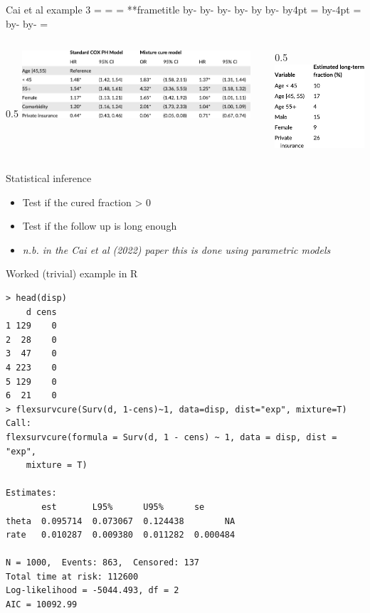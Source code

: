 \documentclass[aspectratio=169,12pt]{beamer} %
\makeatletter
\newif\ifsidebartheme
\newcommand*{\calculatespace}{%
    \contentheight=\paperheight%
    \ifx\beamer@frametitle\@empty%
        \setbox\@tempboxa=\box\voidb@x%
      \else%
        \setbox\@tempboxa=\vbox{%
          \vbox{}%
          {\parskip0pt\usebeamertemplate***{frametitle}}%
        }%
        \ifsidebartheme%
          \advance\contentheight by-1em%
        \fi%
      \fi%
    \advance\contentheight by-\ht\@tempboxa%
    \advance\contentheight by-\dp\@tempboxa%
    \advance\contentheight by-\beamer@frametopskip%
    \ifbeamer@plainframe%
    \contentbottom=0pt%
    \else%
    \advance\contentheight by-\headheight%
    \advance\contentheight by\headdp%
    \advance\contentheight by-\footheight%
    \advance\contentheight by4pt%
    \contentbottom=\footheight%
    \advance\contentbottom by-4pt%
    \fi%
    \contentwidth=\paperwidth%
    \ifbeamer@plainframe%
    \contentleft=0pt%
    \else%
    \advance\contentwidth by-\beamer@rightsidebar%
    \advance\contentwidth by-\beamer@leftsidebar\relax%
    \contentleft=\beamer@leftsidebar%
    \fi%
}
\makeatother
\begin{document}
\begin{frame}{Cai et al example 3}
\calculatespace%
\begin{columns}
\begin{column}{0.5\contentwidth}
  \centering
  \includegraphics[width=0.9\textwidth]{ref/cai_tab2.pdf}
\end{column}
\begin{column}{0.5\contentwidth}
  \centering
  \includegraphics[height=0.6\textheight]{ref/cai_tab3.pdf}
\end{column}
\end{columns}
\end{frame}

\begin{frame}{Statistical inference}
    \begin{itemize}
        \item Test if the cured fraction > 0
	\item Test if the follow up is long enough
	\item \emph{n.b. in the Cai et al (2022) paper this is done using parametric models}
    \end{itemize}
\end{frame}

\lstset{
basicstyle=\tiny\ttfamily,basewidth=0.5em
}
\begin{frame}[fragile=singleslide]{Worked (trivial) example in R}
	\begin{lstlisting}
> head(disp)
    d cens
1 129    0
2  28    0
3  47    0
4 223    0
5 129    0
6  21    0
> flexsurvcure(Surv(d, 1-cens)~1, data=disp, dist="exp", mixture=T)
Call:
flexsurvcure(formula = Surv(d, 1 - cens) ~ 1, data = disp, dist = "exp",
    mixture = T)

Estimates:
       est       L95%      U95%      se
theta  0.095714  0.073067  0.124438        NA
rate   0.010287  0.009380  0.011282  0.000484

N = 1000,  Events: 863,  Censored: 137
Total time at risk: 112600
Log-likelihood = -5044.493, df = 2
AIC = 10092.99
\end{lstlisting}
\end{frame}
\end{document}
